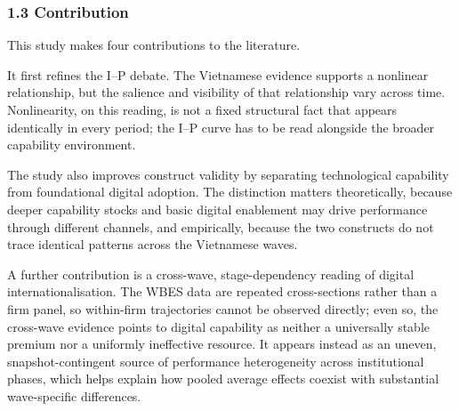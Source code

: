 \documentclass[12pt,a4paper]{article}
\begin{document}
\hypertarget{13-contribution}{%
\subsubsection{1.3 Contribution}\label{13-contribution}}

This study makes four contributions to the literature.

It first refines the I--P debate. The Vietnamese evidence supports a
nonlinear relationship, but the salience and visibility of that
relationship vary across time. Nonlinearity, on this reading, is not a
fixed structural fact that appears identically in every period; the I--P
curve has to be read alongside the broader capability environment.

The study also improves construct validity by separating technological
capability from foundational digital adoption. The distinction matters
theoretically, because deeper capability stocks and basic digital
enablement may drive performance through different channels, and
empirically, because the two constructs do not trace identical patterns
across the Vietnamese waves.

A further contribution is a cross-wave, stage-dependency reading of
digital internationalisation. The WBES data are repeated cross-sections
rather than a firm panel, so within-firm trajectories cannot be observed
directly; even so, the cross-wave evidence points to digital capability
as neither a universally stable premium nor a uniformly ineffective
resource. It appears instead as an uneven, snapshot-contingent source of
performance heterogeneity across institutional phases, which helps
explain how pooled average effects coexist with substantial
wave-specific differences.
\end{document}
